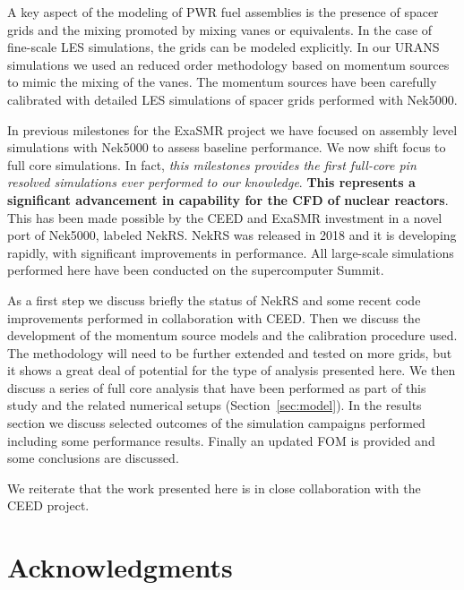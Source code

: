 \documentclass{ecpreportv2}
\begin{document}
A key aspect of the modeling of PWR fuel assemblies is the presence of spacer grids and the mixing promoted by mixing vanes or equivalents. In the case of fine-scale LES simulations, the grids can be modeled explicitly. In our URANS simulations we used an reduced order methodology based on momentum sources to mimic the mixing of the vanes. The momentum sources have been carefully calibrated with detailed LES simulations of spacer grids performed with Nek5000.

In previous milestones for the ExaSMR project we have focused on assembly level simulations with Nek5000 to assess baseline performance. We now shift focus to full core simulations. In fact, \textit{this milestones provides the first full-core pin resolved simulations ever performed to our knowledge}. \textbf{This represents a significant advancement in capability for the CFD of nuclear reactors}. This has been made possible by the CEED and ExaSMR investment in a novel port of Nek5000, labeled NekRS. NekRS was released in 2018 and it is developing rapidly, with significant improvements in performance. All large-scale simulations performed here have been conducted on the supercomputer Summit.

As a first step we discuss briefly the status of NekRS and some recent code improvements performed in collaboration with CEED.   Then we discuss the development of the momentum source models and the calibration procedure used. The methodology will need to be further extended and tested on more grids, but it shows a great deal of potential for the type of analysis presented here. We then discuss a series of full core analysis that have been performed as part of this study and the related numerical setups (Section~\ref{sec:model}). In the results section we discuss selected outcomes of the simulation campaigns performed including some performance results. Finally an updated FOM is provided and some conclusions are discussed.

We reiterate  that the work presented here is in close collaboration with the CEED project.







\section*{Acknowledgments}
\end{document}
